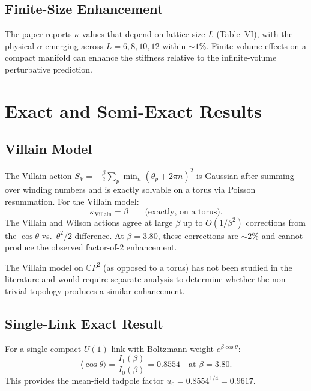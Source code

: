 \documentclass[11pt]{article}
\begin{document}
\subsection{Finite-Size Enhancement}

The paper reports $\kappa$ values that depend on lattice size $L$
(Table~VI), with the physical $\alpha$ emerging across $L = 6, 8, 10, 12$
within $\sim\!1\%$.  Finite-volume effects on a compact manifold
can enhance the stiffness relative to the infinite-volume perturbative
prediction.


\section{Exact and Semi-Exact Results}

\subsection{Villain Model}

The Villain action
$S_V = -\frac{\beta}{2}\sum_p \min_n (\theta_p + 2\pi n)^2$
is Gaussian after summing over winding numbers and is exactly
solvable on a torus via Poisson resummation.  For the Villain model:
\begin{equation}
  \kappa_{\text{Villain}} = \beta \qquad\text{(exactly, on a torus)}.
\end{equation}
The Villain and Wilson actions agree at large $\beta$ up to $O(1/\beta^2)$
corrections from the $\cos\theta$ vs.\ $\theta^2/2$ difference.
At $\beta = 3.80$, these corrections are $\sim\!2\%$ and cannot produce
the observed factor-of-2 enhancement.

The Villain model on $\mathbb{C}P^2$ (as opposed to a torus) has not been
studied in the literature and would require separate analysis to determine
whether the non-trivial topology produces a similar enhancement.

\subsection{Single-Link Exact Result}

For a single compact $U(1)$ link with Boltzmann weight $e^{\beta\cos\theta}$:
\begin{equation}
  \langle\cos\theta\rangle = \frac{I_1(\beta)}{I_0(\beta)}
  = 0.8554 \quad\text{at }\beta = 3.80.
\end{equation}
This provides the mean-field tadpole factor $u_0 = 0.8554^{1/4} = 0.9617$.
\end{document}
